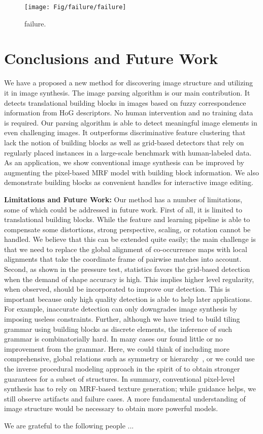 \documentclass{acmtog}
\begin{document}
\begin{figure*}
	\centering
		\texttt{[image: Fig/failure/failure]}
	\caption{failure.}
	\label{fig:failure} \vspace{-10pt}
\end{figure*}
 

\section{Conclusions and Future Work}

We have a proposed a new method for discovering image structure and utilizing it in image synthesis. The image parsing algorithm is our main contribution. It detects translational building blocks in images based on fuzzy correspondence information from HoG descriptors. No human intervention and no training data is required. Our parsing algorithm is able to detect meaningful image elements in even challenging images. It outperforms discriminative feature clustering that lack the notion of building blocks as well as grid-based detectors that rely on regularly placed instances in a large-scale benchmark with human-labeled data. As an application, we show conventional image synthesis can be improved by augmenting the pixel-based MRF model with building block information. We also demonstrate building blocks as convenient handles for interactive image editing. 

\textbf{Limitations and Future Work:} Our method has a number of limitations, some of which could be addressed in future work. First of all, it is limited to translational building blocks. While the feature and learning pipeline is able to compensate some distortions, strong perspective, scaling, or rotation cannot be handled. We believe that this can be extended quite easily; the main challenge is that we need to replace the global alignment of co-occurrence maps with local alignments that take the coordinate frame of pairwise matches into account. Second, as shown in the pressure test, statistics favors the grid-based detection when the demand of shape accuracy is high. This implies higher level regularity, when observed, should be incorporated to improve our detection. This is important because only high quality detection is able to help later applications. For example, inaccurate detection can only downgrades image synthesis by imposing useless constraints. Further, although we have tried to build tiling grammar using building blocks as discrete elements, the inference of such grammar is combinatorially hard. In many cases our found little or no improvement from the grammar. Here, we could think of including more comprehensive, global relations such as symmetry or hierarchy~\cite{Hu2013PPI}, or we could use the inverse procedural modeling approach in the spirit of \cite{BOKELOHsig2010,Sylvain2010AT} to obtain stronger guarantees for a subset of structures. In summary, conventional pixel-level synthesis has to rely on MRF-based texture generation; while guidance helps, we still observe artifacts and failure cases. A more fundamental understanding of image structure would be necessary to obtain more powerful models.

\begin{acks}
We are grateful to the following people ... 
\end{acks}





\end{document}
